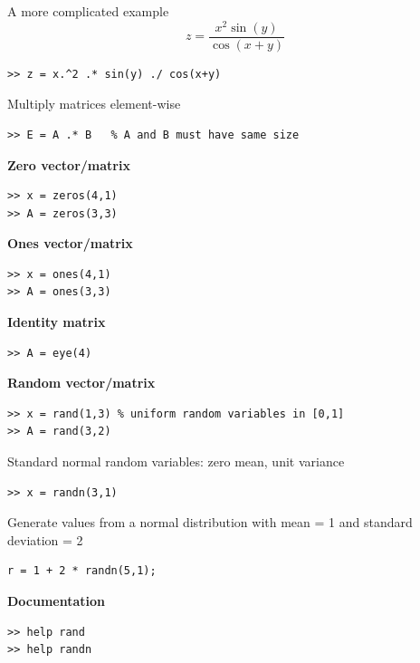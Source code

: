 \documentclass[11pt,xcolor=svgnames,onlymath]{beamer}
\begin{document}
\begin{frame}
A more complicated example
\[
z = \frac{x^2 \sin(y)}{\cos(x+y)}
\]

\begin{lstlisting}
>> z = x.^2 .* sin(y) ./ cos(x+y)
\end{lstlisting}

Multiply matrices element-wise
\begin{lstlisting}
>> E = A .* B   % A and B must have same size
\end{lstlisting}


{\bf Zero vector/matrix}
\begin{lstlisting}
>> x = zeros(4,1)
>> A = zeros(3,3)
\end{lstlisting}

{\bf Ones vector/matrix}
\begin{lstlisting}
>> x = ones(4,1)
>> A = ones(3,3)
\end{lstlisting}

{\bf Identity matrix}
\begin{lstlisting}
>> A = eye(4)
\end{lstlisting}

\pagebreak

{\bf Random vector/matrix}
\begin{lstlisting}
>> x = rand(1,3) % uniform random variables in [0,1]
>> A = rand(3,2)
\end{lstlisting}

Standard normal random variables: zero mean, unit variance
\begin{lstlisting}
>> x = randn(3,1)
\end{lstlisting}
Generate values from a normal distribution with mean = 1 and standard deviation = 2
\begin{lstlisting}
r = 1 + 2 * randn(5,1);
\end{lstlisting}

{\bf Documentation}
\begin{lstlisting}
>> help rand
>> help randn
\end{lstlisting}

\end{frame}
\end{document}
